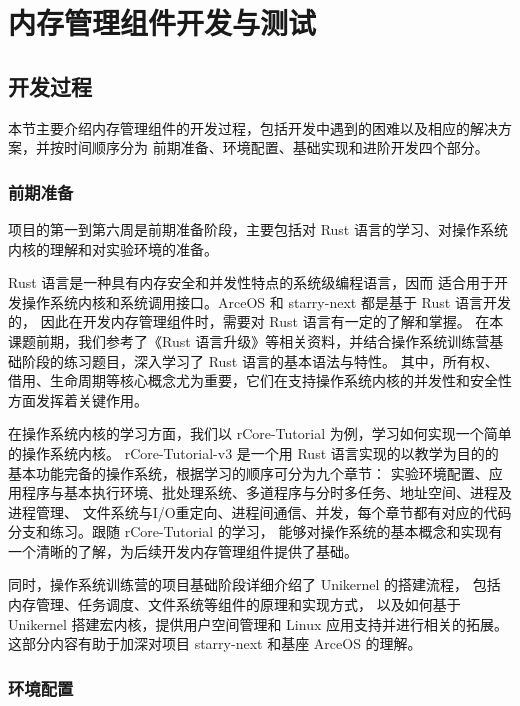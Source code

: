
\chapter{内存管理组件开发与测试}

\section{开发过程}

本节主要介绍内存管理组件的开发过程，包括开发中遇到的困难以及相应的解决方案，并按时间顺序分为
前期准备、环境配置、基础实现和进阶开发四个部分。

\subsection{前期准备}

项目的第一到第六周是前期准备阶段，主要包括对 Rust 语言的学习、对操作系统内核的理解和对实验环境的准备。

Rust 语言是一种具有内存安全和并发性特点的系统级编程语言，因而
适合用于开发操作系统内核和系统调用接口。ArceOS 和 starry-next 都是基于 Rust 语言开发的，
因此在开发内存管理组件时，需要对 Rust 语言有一定的了解和掌握。
在本课题前期，我们参考了《Rust 语言升级》等相关资料，并结合操作系统训练营基础阶段的练习题目，深入学习了 Rust 语言的基本语法与特性。
其中，所有权、借用、生命周期等核心概念尤为重要，它们在支持操作系统内核的并发性和安全性方面发挥着关键作用。

在操作系统内核的学习方面，我们以 rCore-Tutorial 为例，学习如何实现一个简单的操作系统内核。
rCore-Tutorial-v3 是一个用 Rust 语言实现的以教学为目的的基本功能完备的操作系统，根据学习的顺序可分为九个章节：
实验环境配置、应用程序与基本执行环境、批处理系统、多道程序与分时多任务、地址空间、进程及进程管理、
文件系统与I/O重定向、进程间通信、并发，每个章节都有对应的代码分支和练习。跟随 rCore-Tutorial 的学习，
能够对操作系统的基本概念和实现有一个清晰的了解，为后续开发内存管理组件提供了基础。

同时，操作系统训练营的项目基础阶段详细介绍了 Unikernel 的搭建流程，
包括内存管理、任务调度、文件系统等组件的原理和实现方式，
以及如何基于 Unikernel 搭建宏内核，提供用户空间管理和 Linux 应用支持并进行相关的拓展。
这部分内容有助于加深对项目 starry-next 和基座 ArceOS 的理解。

\subsection{环境配置}

